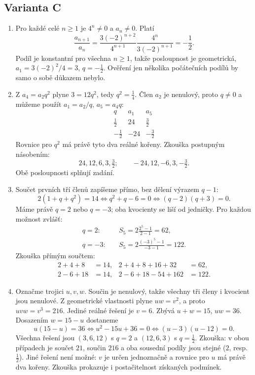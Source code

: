 \documentclass[a4paper,10pt]{article}
\begin{document}
\subsection*{Varianta C}
\begin{enumerate}
\item Pro každé celé $n\geq1$ je $4^n\ne0$ a $a_n\ne0$. Platí
\[
\frac{a_{n+1}}{a_n}
=\frac{3(-2)^{n+2}}{4^{n+1}}\frac{4^n}{3(-2)^{n+1}}
=-\frac12.
\]
Podíl je konstantní pro všechna $n\geq1$, takže posloupnost je geometrická,
$a_1=3(-2)^2/4=3$, $q=-\frac12$.
Ověření jen několika počátečních podílů by samo o sobě důkazem nebylo.

\item Z $a_4=a_2q^2$ plyne $3=12q^2$, tedy $q^2=\frac14$.
Člen $a_2$ je nenulový, proto $q\ne0$ a můžeme použít
$a_1=a_2/q$, $a_5=a_4q$:
\[
\begin{array}{c|c|c}
q&a_1&a_5\\ \hline
\frac12&24&\frac32\\
-\frac12&-24&-\frac32
\end{array}
\]
Rovnice pro $q^2$ má právě tyto dva reálné kořeny.
Zkouška postupným násobením:
\[
24,12,6,3,\tfrac32;\qquad -24,12,-6,3,-\tfrac32.
\]
Obě posloupnosti splňují zadání.

\item Součet prvních tří členů zapíšeme přímo, bez dělení výrazem $q-1$:
\[
2(1+q+q^2)=14
\iff q^2+q-6=0
\iff(q-2)(q+3)=0.
\]
Máme právě $q=2$ nebo $q=-3$; oba kvocienty se liší od jedničky.
Pro každou možnost zvlášť:
\[
\begin{aligned}
q=2:&\quad S_5=2\frac{2^5-1}{2-1}=62,\\
q=-3:&\quad S_5=2\frac{(-3)^5-1}{-3-1}=122.
\end{aligned}
\]
Zkouška přímým součtem:
\[
\begin{aligned}
2+4+8&=14,&2+4+8+16+32&=62,\\
2-6+18&=14,&2-6+18-54+162&=122.
\end{aligned}
\]

\item Označme trojici $u,v,w$. Součin je nenulový, takže všechny tři
členy i kvocient jsou nenulové. Z geometrické vlastnosti plyne $uw=v^2$,
a proto $uvw=v^3=216$. Jediné reálné řešení je $v=6$.
Zbývá $u+w=15$, $uw=36$. Dosazením $w=15-u$ dostaneme
\[
u(15-u)=36\iff u^2-15u+36=0\iff(u-3)(u-12)=0.
\]
Všechna řešení jsou $(3,6,12)$ s $q=2$ a $(12,6,3)$ s $q=\frac12$.
Zkouška: v obou případech je součet $21$, součin $216$ a oba sousední
podíly jsou stejné ($2$, resp. $\frac12$).
Jiné řešení není možné: $v$ je určen jednoznačně a rovnice pro $u$ má
právě dva kořeny. Zkouška prokazuje i postačitelnost získaných podmínek.
\end{enumerate}
\end{document}
